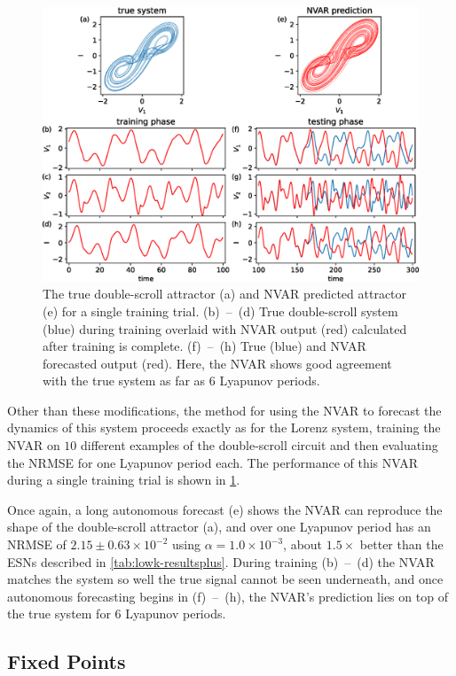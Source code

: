 \begin{figure}
  \includegraphics[width=\textwidth]{figures/nvar-predict-dscroll}
  \caption{The true double-scroll attractor (a) and NVAR predicted
    attractor (e) for a single training trial. (b)~--~(d) True
    double-scroll system (blue) during training overlaid with NVAR
    output (red) calculated after training is complete. (f)~--~(h)
    True (blue) and NVAR forecasted output (red). Here, the NVAR
    shows good agreement with the true system as far as $6$ Lyapunov
    periods.}
  \label{fig:nvar-predict-dscroll}
\end{figure}

Other than these modifications, the method for using the NVAR to
forecast the dynamics of this system proceeds exactly as for the Lorenz
system, training the NVAR on $10$ different examples of the
double-scroll circuit and then evaluating the NRMSE for one Lyapunov
period each. The performance of this NVAR during a single training
trial is shown in \cref{fig:nvar-predict-dscroll}.

Once again, a long autonomous forecast (e) shows the NVAR can
reproduce the shape of the double-scroll attractor (a), and over one
Lyapunov period has an NRMSE of $2.15\pm0.63\times10^{-2}$ using
$\alpha = 1.0\times10^{-3}$, about $1.5\times$ better than the ESNs
described in \cref{tab:lowk-resultsplus}. During training (b)~--~(d)
the NVAR matches the system so well the true signal cannot be seen
underneath, and once autonomous forecasting begins in (f)~--~(h), the
NVAR's prediction lies on top of the true system for $6$ Lyapunov
periods.

\subsection{Fixed Points}


